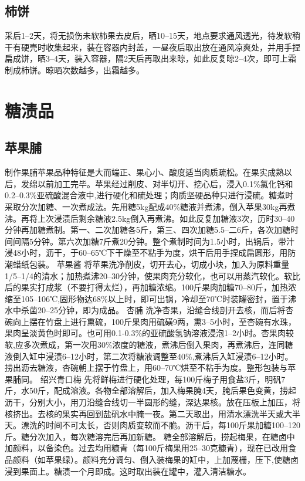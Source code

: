 \documentclass{ctexbook}
\begin{document}
\subsection{柿饼}
采后1--2天，将无损伤未软柿果去皮后，晒10--15天，地点要求通风透光，待发软稍干有硬壳时收集起来，装在容器内封盖，一昼夜后取出放在通风凉爽处，并用手捏扁成饼，晒3--4天，装入容器，隔2天后再取出来晾，如此反复晾2--4次，即可上霜制成柿饼。晾晒次数越多，出霜越多。
\section{糖渍品}
\subsection{苹果脯}
制作果脯苹果品种特征是大而端正、果心小、酸度适当肉质疏松。在果实成熟以后，发绵以前加工完毕。苹果经过削皮、对半切开、挖心后，浸入0.1\%氯化钙和0.2--0.3\%亚硫酸混合液中,进行硬化和硫处理；肉质坚硬品种只进行浸硫。糖煮时采取分次加糖、一次煮成法。先用糖5kg配成40\%糖液并煮沸，倒入苹果30kg再煮沸。再将上次浸渍后剩余糖液2.5kg倒入再煮沸。如此反复加糖液3次，历时30--40分钟再加糖煮制。第一、二次加糖各5斤，第三、四次加糖5.5--二6斤，各次加糖时间间隔5分钟。第六次加糖7斤煮20分钟。整个煮制时间为1.5小时，出锅后，带汁浸48小时，沥干，于60--65℃下干燥至不粘手为度，烘干后用手捏成扁圆形，用防潮蜡纸包装。
苹果酱
将苹果洗净削皮，切开去心，切成小块，加入为原料重量1/5--1/4的清水；加热煮沸20--30分钟，使果肉充分软化，也可以用蒸汽软化。软比后的果实打成浆（不要打得太烂），再加糖浓缩。100斤果肉加糖70--80斤，加热浓缩至105--106℃,固形物达68\%以上时，即可出锅，冷却至70℃时装罐密封，置于沸水中杀菌20--25分钟，即为成品。
杏脯
洗净杏果，沿缝合线剖开去核，而后将杏碗向上摆在竹盘上进行熏硫，100斤果肉用硫磺9两，熏3--5小时，至杏碗有水珠，果肉呈淡黄色时即可。也可用0.1-0.3\%的亚硫酸氢钠溶液浸泡1--2小时。杏果肉较软,应多次煮成，第一次用30\%浓度的糖液，煮沸后倒入果肉，再煮沸后，连同糖液倒入缸中浸渍6--12小时，第二次将糖液调整至40\%,煮沸后入缸浸渍6--12小时。捞出沥去糖液，杏碗朝上摆于竹盘上，用60--70℃烘至不粘手为度。整形包装与苹果脯同。
绍兴青口梅
先将鲜梅进行硬化处理，每100斤梅子用食盐3斤，明矾7斤，水50斤，配成溶液。各物全部溶解后，加入梅果腌4天，腌后果色变黄，捞起沥干，分别大小，用刀沿缝合线切一半圆形的缝，深达果核。放在压板上加压，将核挤出。去核的果实再回到盐矾水中腌一夜。第二天取出，用清水漂洗半天或大半天。漂洗的时间不可太长，否则肉质变软而不脆。沥干后，每100斤果加糖100--120斤。糖分次加入，每次糖溶完后再加新糖。
糖全部溶解后，捞起梅果，在糖卤中加颜料，以备染色。过去均用糠青（每100斤梅果用25--30克糠青），现在已改用食品颜料（如苹果绿）。颜料充分调匀、倒入装梅果的缸中，上加蔑栅，压下,使糖卤浸到果面上。糖渍一个月即成。这时取出装在罐中，灌入清洁糖水。
\end{document}
